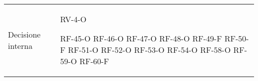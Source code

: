 \begin{longtable}{ 
		>{}p{} 
		>{}p{} }
Decisione interna &
	RV-4-O	\newline
	
	RF-45-O \newline
	RF-46-O \newline
	RF-47-O \newline
	RF-48-O \newline
	RF-49-F \newline
	RF-50-F \newline
	RF-51-O \newline
	RF-52-O \newline
	RF-53-O \newline
	RF-54-O \newline
	RF-58-O \newline
	RF-59-O \newline
	RF-60-F \tabularnewline
	

\end{longtable}
